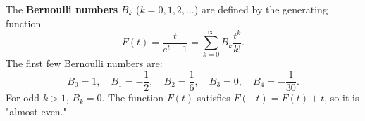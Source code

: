The \textbf{Bernoulli numbers} $B_k$ ($k = 0, 1, 2, \dots$) are defined by the generating function
$$F(t) = \frac{t}{e^t - 1} = \sum_{k=0}^{\infty} B_k \frac{t^k}{k!}.$$
The first few Bernoulli numbers are:
$$B_0 = 1, \quad B_1 = -\frac{1}{2}, \quad B_2 = \frac{1}{6}, \quad B_3 = 0, \quad B_4 = -\frac{1}{30}.$$
For odd $k > 1$, $B_k = 0$. The function $F(t)$ satisfies $F(-t) = F(t) + t$, so it is "almost even."
